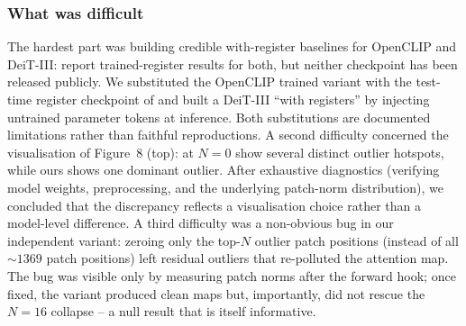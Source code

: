 \subsubsection{What was difficult}
The hardest part was building credible with-register baselines for OpenCLIP and DeiT-III: \citet{darcet2024vision} report trained-register results for both, but neither checkpoint has been released publicly. We substituted the OpenCLIP trained variant with the test-time register checkpoint of \citet{jiang2025vision} and built a DeiT-III ``with registers'' by injecting untrained parameter tokens at inference. Both substitutions are documented limitations rather than faithful reproductions. A second difficulty concerned the visualisation of Figure~8 (top): at $N=0$ \citet{darcet2024vision} show several distinct outlier hotspots, while ours shows one dominant outlier. After exhaustive diagnostics (verifying model weights, preprocessing, and the underlying patch-norm distribution), we concluded that the discrepancy reflects a visualisation choice rather than a model-level difference. A third difficulty was a non-obvious bug in our independent variant: zeroing only the top-$N$ outlier patch positions (instead of all $\sim 1369$ patch positions) left residual outliers that re-polluted the attention map. The bug was visible only by measuring patch norms after the forward hook; once fixed, the variant produced clean maps but, importantly, did not rescue the $N=16$ collapse -- a null result that is itself informative.
